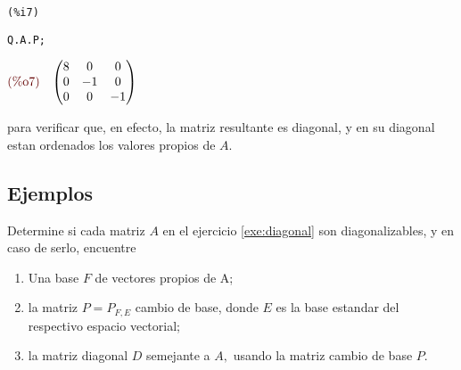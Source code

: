 \begin{solucion}
\noindent
\begin{minipage}{8ex}{\color{red}\bf
\begin{verbatim}
(%i7)
\end{verbatim}}
\end{minipage}
\begin{minipage}{\textwidth}{\color{blue}
\begin{verbatim}
Q.A.P;
\end{verbatim}}
\end{minipage}
\begin{math}\displaystyle
\parbox{8ex}{\color{labelcolor}(\%o7) }
\begin{pmatrix}8 & 0 & 0\cr 0 & -1 & 0\cr 0 & 0 & -1\end{pmatrix}
\end{math}

para verificar que, en efecto, la matriz resultante es diagonal, y en su diagonal estan ordenados los valores propios
de $A.$
\end{solucion}

\subsection*{Ejemplos}

\begin{problema}
 Determine si cada matriz $A$ en el ejercicio  \ref{exe:diagonal} son diagonalizables, y en caso de serlo, encuentre
 \begin{enumerate}
  \item Una base $F$ de vectores propios de A;
  \item la matriz $P=P_{F,E}$ cambio de base, donde  $E$ es la base estandar del respectivo espacio vectorial;
  \item la matriz diagonal $D$ semejante a $A,$ usando la matriz cambio de base $P.$
 \end{enumerate} 

\end{problema}


